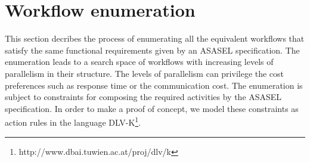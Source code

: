 

\section{Workflow enumeration} \label{sec:workflowTransformation}

This section decribes the process of enumerating all the equivalent workflows that satisfy the same functional requirements given by an ASASEL specification. The enumeration leads to a search space of workflows with increasing levels of parallelism in their structure. The levels of parallelism can privilege the cost preferences such as response time or the communication cost. The enumeration is subject to constraints for composing the required activities by the ASASEL specification. In order to make a proof of concept, we model these constraints as action rules in the language DLV-K\footnote{http://www.dbai.tuwien.ac.at/proj/dlv/k}.

